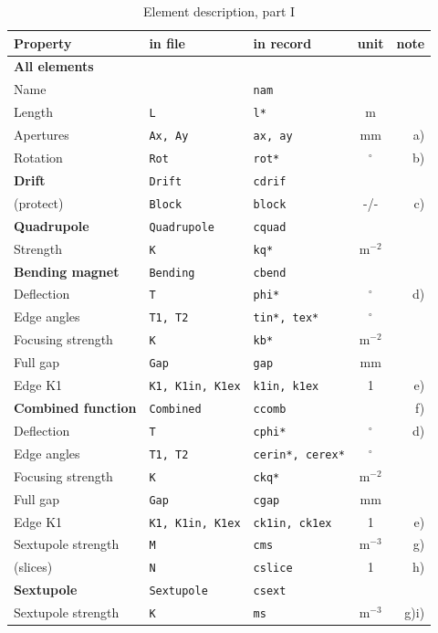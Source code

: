 \documentclass[12pt]{article}
\newcommand{\degree}{\mbox{$^{\circ}$}}
\begin{document}
\begin{table}
\caption{\label{tabel2}Element description, part I}\vspace{1em}
\begin{tabular}{lllcr}
Property & in file & in record & unit & note \\
\hline
\multicolumn{5}{l}{{\bf All elements}}\\
Name	& & {\tt nam} & & \\ 
Length		& {\tt L} & {\tt l*} & m & \\
Apertures & {\tt Ax, Ay} & {\tt ax, ay} & mm & a) \\
Rotation & {\tt Rot} & {\tt rot*} & \degree & b) \\
\hline
{\bf Drift} & {\tt Drift} & {\tt cdrif} & & \\
(protect) & {\tt Block} & {\tt block} & -/- & c) \\
\hline
{\bf Quadrupole} & {\tt Quadrupole} & {\tt cquad} & & \\
Strength & {\tt K} & {\tt kq*} & m$^{-2}$ & \\
\hline
{\bf Bending magnet} & {\tt Bending} & {\tt cbend} & & \\
Deflection & {\tt T} & {\tt phi*} & \degree & d) \\
Edge angles & {\tt T1, T2} & {\tt tin*, tex*} & \degree & \\
Focusing strength & {\tt K} & {\tt kb*} & m$^{-2}$ & \\
Full gap & {\tt Gap} & {\tt gap} & mm & \\
Edge K1 & {\tt K1, K1in, K1ex} & {\tt k1in, k1ex} & 1 & e) \\
\hline
{\bf Combined function} & {\tt Combined} & {\tt ccomb} & & f) \\
Deflection & {\tt T} & {\tt cphi*} & \degree & d) \\
Edge angles & {\tt T1, T2} & {\tt cerin*, cerex*} & \degree & \\
Focusing strength & {\tt K} & {\tt ckq*} & m$^{-2}$ & \\
Full gap & {\tt Gap} & {\tt cgap} & mm & \\
Edge K1 & {\tt K1, K1in, K1ex} & {\tt ck1in, ck1ex} & 1 & e) \\
Sextupole strength & {\tt M} & {\tt cms} & m$^{-3}$ & g) \\
(slices) & {\tt N} & {\tt cslice} & 1 & h) \\
\hline
{\bf Sextupole} & {\tt Sextupole} & {\tt csext} & &  \\
Sextupole strength & {\tt K} & {\tt ms} & m$^{-3}$ & g)i) \\

\end{tabular}
\end{table}
\end{document}
